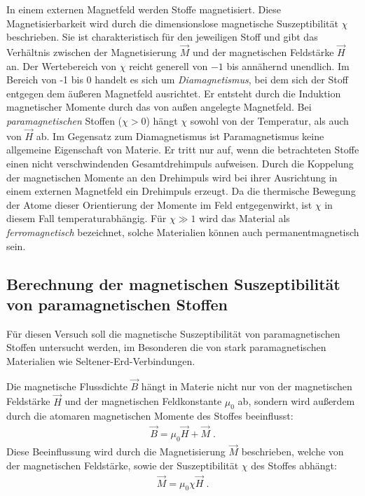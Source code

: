 
In einem externen Magnetfeld werden Stoffe magnetisiert. Diese Magnetisierbarkeit wird durch die dimensionslose magnetische Suszeptibilität $\chi$ beschrieben. Sie ist charakteristisch für den jeweiligen Stoff und gibt das Verhältnis zwischen der Magnetisierung $\vec M$ und der magnetischen Feldstärke $\vec H$ an. Der Wertebereich von $\chi$ reicht generell von $-1$ bis annähernd unendlich. Im Bereich von -1 bis 0 handelt es sich um \emph{Diamagnetismus}, bei dem sich der Stoff entgegen dem äußeren Magnetfeld ausrichtet. Er entsteht durch die Induktion magnetischer Momente durch das von außen angelegte Magnetfeld.
Bei \emph{paramagnetischen} Stoffen ($\chi > 0$) hängt $\chi$ sowohl von der Temperatur, als auch von $\vec H$ ab. Im Gegensatz zum Diamagnetismus ist Paramagnetismus keine allgemeine Eigenschaft von Materie. Er tritt nur auf, wenn die betrachteten Stoffe einen nicht verschwindenden Gesamtdrehimpuls aufweisen. Durch die Koppelung der magnetischen Momente an den Drehimpuls wird bei ihrer Ausrichtung in einem externen Magnetfeld ein Drehimpuls erzeugt. Da die thermische Bewegung der Atome dieser Orientierung der Momente im Feld entgegenwirkt, ist $\chi$ in diesem Fall temperaturabhängig.
Für $\chi \gg 1$ wird das Material als \emph{ferromagnetisch} bezeichnet, solche Materialien können auch permanentmagnetisch sein.

\subsection{Berechnung der magnetischen Suszeptibilität von paramagnetischen Stoffen}
Für diesen Versuch soll die magnetische Suszeptibilität von paramagnetischen Stoffen untersucht werden, im Besonderen die von stark paramagnetischen Materialien wie Seltener-Erd-Verbindungen.

Die magnetische Flussdichte $\vec B$ hängt in Materie nicht nur von der magnetischen Feldstärke $\vec H$ und der magnetischen Feldkonstante $\mu_0$ ab, sondern wird außerdem durch die atomaren magnetischen Momente des Stoffes beeinflusst:
\begin{align}
  \label{equ:B}
  \vec B = \mu_0 \vec H + \vec M \; .
\end{align}
Diese Beeinflussung wird durch die Magnetisierung $\vec M$ beschrieben, welche von der magnetischen Feldstärke, sowie der Suszeptibilität $\chi$ des Stoffes abhängt:
\begin{align}
  \label{M}
  \vec M = \mu_0 \chi \vec H \; .
\end{align}

